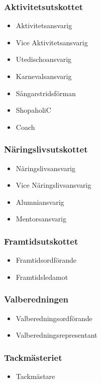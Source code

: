 \documentclass{dsekprotokoll}
\begin{document}
\begin{multicols}{2}
  \subsubsection*{Aktivitetsutskottet}
  \begin{itemize}
    \item Aktivitetsansvarig
    \item Vice Aktivitetsansvarig
    \item Utedischoansvarig
    \item Karnevalsansvarig
    \item Sångarstridsförman
    \item ShopaholiC
    \item Coach
  \end{itemize}
  \subsubsection*{Näringslivsutskottet}
  \begin{itemize}
    \item Näringslivsansvarig
    \item Vice Näringslivsansvarig
    \item Alumniansvarig
    \item Mentorsansvarig
  \end{itemize}
  \subsubsection*{Framtidsutskottet}
  \begin{itemize}
    \item Framtidsordförande
    \item Framtidsledamot
  \end{itemize}

  \subsubsection*{Valberedningen}
  \begin{itemize}
    \item Valberedningsordförande
    \item Valberedningsrepresentant
  \end{itemize}

  \subsubsection*{Tackmästeriet}
  \begin{itemize}
    \item Tackmästare
  \end{itemize}


\end{multicols}
\end{document}
